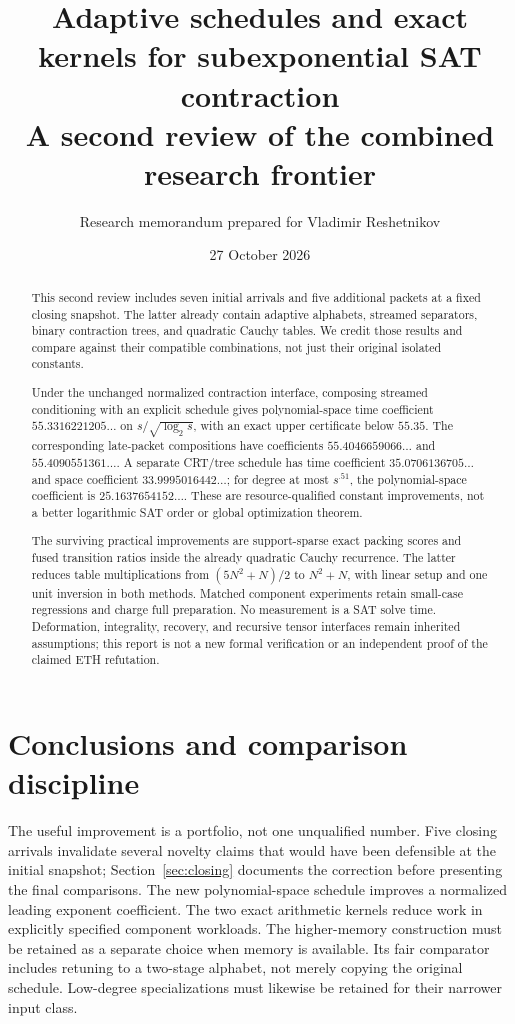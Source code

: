 \documentclass[11pt,letterpaper]{article}
\title{Adaptive schedules and exact kernels for subexponential SAT contraction\\[5pt]\large A second review of the combined research frontier}
\author{Research memorandum prepared for Vladimir Reshetnikov}
\date{27 October 2026}
\theoremstyle{remark}\newtheorem{remark}[theorem]{Remark}
\begin{document}
\maketitle
\begin{abstract}
This second review includes seven initial arrivals and five additional packets
at a fixed closing snapshot. The latter already contain adaptive alphabets,
streamed separators, binary contraction trees, and quadratic Cauchy tables.
We credit those results and compare against their compatible combinations,
not just their original isolated constants.

Under the unchanged normalized contraction interface, composing streamed
conditioning with an explicit schedule gives polynomial-space time coefficient
$55.3316221205\ldots$ on $s/\sqrt{\log_2s}$, with an exact upper certificate
below $55.35$. The corresponding late-packet compositions have coefficients
$55.4046659066\ldots$ and $55.4090551361\ldots$. A separate CRT/tree schedule
has time coefficient $35.0706136705\ldots$ and space coefficient
$33.9995016442\ldots$; for degree at most $s^{.51}$, the polynomial-space
coefficient is $25.1637654152\ldots$. These are resource-qualified constant
improvements, not a better logarithmic SAT order or global optimization theorem.

The surviving practical improvements are support-sparse exact packing scores
and fused transition ratios inside the already quadratic Cauchy recurrence.
The latter reduces table multiplications from $(5N^2+N)/2$ to $N^2+N$,
with linear setup and one unit inversion in both methods. Matched component
experiments retain small-case regressions and charge full preparation.
No measurement is a SAT solve time. Deformation, integrality, recovery, and
recursive tensor interfaces remain inherited assumptions; this report is not
a new formal verification or an independent proof of the claimed ETH refutation.
\end{abstract}
\setcounter{tocdepth}{1}
\begingroup\small
\setlength{\parskip}{0pt}
\makeatletter{}\makeatother
\tableofcontents
\endgroup
\newpage

\section{Conclusions and comparison discipline}
\label{sec:conclusions}
The useful improvement is a portfolio, not one unqualified number. Five closing arrivals invalidate several novelty claims that would have been defensible at the initial snapshot; Section~\ref{sec:closing} documents the correction before presenting the final comparisons. The new polynomial-space schedule improves a normalized leading exponent coefficient. The two exact arithmetic kernels reduce work in explicitly specified component workloads. The higher-memory construction must be retained as a separate choice when memory is available. Its fair comparator includes retuning to a two-stage alphabet, not merely copying the original schedule. Low-degree specializations must likewise be retained for their narrower input class.
\end{document}
